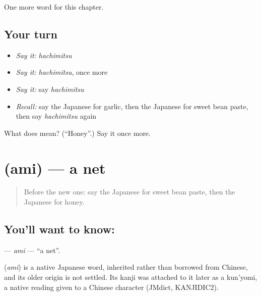 \begin{grammarlens}[title={What you've built}]
One more word for this chapter.
\end{grammarlens}

\subsection*{Your turn}
\begin{itemize}
\raggedright
  \item \emph{Say it:} \emph{hachimitsu}
  \item \emph{Say it:} \emph{hachimitsu}, once more
  \item \emph{Say it:} say \emph{hachimitsu}
  \item \emph{Recall:} say the Japanese for garlic, then the Japanese for sweet bean paste, then say \emph{hachimitsu} again
\end{itemize}

\begin{tcolorbox}[breakable,colback=teal!4,colframe=teal!35!black,title={Before you move on}]
What does  mean? (\textquotedblleft{}Honey\textquotedblright{}.) Say it once more.
\end{tcolorbox}
\section[\texorpdfstring{\ja{あみ} (ami)}{あみ (ami)}]{ (ami) — a net}

\label{lesson:JA-C114-ami}



\begin{quote}
Before the new one: say the Japanese for sweet bean paste, then the Japanese for honey.
\end{quote}

\subsection*{You'll want to know: }
\textbf{} — \emph{ami} — \textquotedblleft{}a net\textquotedblright{}.

\begin{cousinweb}
\textbf{} (\emph{ami}) is a native Japanese word, inherited rather than borrowed from Chinese, and its older origin is not settled. Its kanji was attached to it later as a kun'yomi, a native reading given to a Chinese character (JMdict, KANJIDIC2).
\end{cousinweb}

